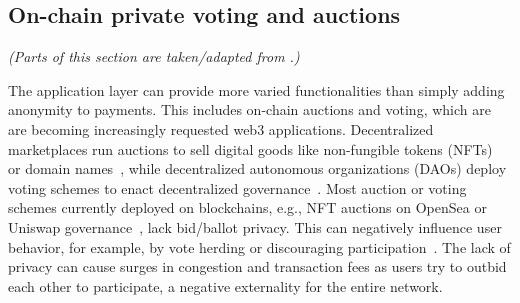 \subsection{On-chain private voting and auctions}\label{sec:cicada}

\textit{(Parts of this section are taken/adapted from \cite{EPRINT:GSZB23}.)}

The application layer can provide more varied functionalities than simply adding anonymity to payments. This includes on-chain auctions and voting, which are are becoming increasingly requested web3 applications.
Decentralized marketplaces run auctions to sell digital goods like non-fungible tokens (NFTs)~\cite{opensea_auction} or domain names~\cite{ARXIV:XWYLLX21}, while decentralized autonomous organizations (DAOs) deploy voting schemes to enact decentralized governance~\cite{optimismgov}. 
Most auction or voting schemes currently deployed on blockchains, e.g., NFT auctions on OpenSea or Uniswap governance~\cite{ARXIV:FMW22}, lack bid/ballot privacy. This can negatively influence user behavior, for example, by vote herding or discouraging participation~\cite{FC:ElkLip04,WTSC:GalYou18,FC:SuzYok03}. The lack of privacy can cause surges in congestion and transaction fees as users try to outbid each other to participate, a negative externality for the entire network.
    
